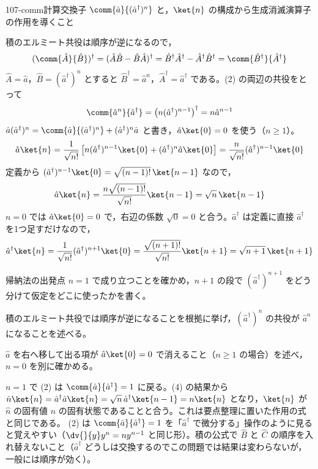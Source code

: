 \documentclass[uplatex,dvipdfmx,a4paper,11pt]{jsarticle}
\begin{document}
\begin{mondai}{107-comm}{計算}{交換子 $\comm{\hat{a}}{(\hat{a}^{\dagger})^{n}}$ と，$\ket{n}$ の構成から生成消滅演算子の作用を導くこと}
\begin{tadashii}
 積のエルミート共役は順序が逆になるので，
\[ (\comm{\hat{A}}{\hat{B}})^{\dagger}=(\hat{A}\hat{B}-\hat{B}\hat{A})^{\dagger}=\hat{B}^{\dagger}\hat{A}^{\dagger}-\hat{A}^{\dagger}\hat{B}^{\dagger}=\comm{\hat{B}^{\dagger}}{\hat{A}^{\dagger}} \]
$\hat{A}=\hat{a}$，$\hat{B}=(\hat{a}^{\dagger})^{n}$ とすると $\hat{B}^{\dagger}=\hat{a}^{n}$，$\hat{A}^{\dagger}=\hat{a}^{\dagger}$ である。(2) の両辺の共役をとって
\[ \comm{\hat{a}^{n}}{\hat{a}^{\dagger}}=\left(n(\hat{a}^{\dagger})^{n-1}\right)^{\dagger}=n\hat{a}^{n-1} \]
 $\hat{a}(\hat{a}^{\dagger})^{n}=\comm{\hat{a}}{(\hat{a}^{\dagger})^{n}}+(\hat{a}^{\dagger})^{n}\hat{a}$ と書き，$\hat{a}\ket{0}=0$ を使う（$n\ge 1$）。
\[ \hat{a}\ket{n}=\frac{1}{\sqrt{n!}}\left[n(\hat{a}^{\dagger})^{n-1}\ket{0}+(\hat{a}^{\dagger})^{n}\hat{a}\ket{0}\right]=\frac{n}{\sqrt{n!}}(\hat{a}^{\dagger})^{n-1}\ket{0} \]
定義から $(\hat{a}^{\dagger})^{n-1}\ket{0}=\sqrt{(n-1)!}\,\ket{n-1}$ なので，
\[ \hat{a}\ket{n}=\frac{n\sqrt{(n-1)!}}{\sqrt{n!}}\ket{n-1}=\sqrt{n}\,\ket{n-1} \]
$n=0$ では $\hat{a}\ket{0}=0$ で，右辺の係数 $\sqrt{0}=0$ と合う。$\hat{a}^{\dagger}$ は定義に直接 $\hat{a}^{\dagger}$ を1つ足すだけなので，
\[ \hat{a}^{\dagger}\ket{n}=\frac{1}{\sqrt{n!}}(\hat{a}^{\dagger})^{n+1}\ket{0}=\frac{\sqrt{(n+1)!}}{\sqrt{n!}}\ket{n+1}=\sqrt{n+1}\,\ket{n+1} \]
\begin{ronten}
  \item {} 帰納法の出発点 $n=1$ で成り立つことを確かめ，$n+1$ の段で $(\hat{a}^{\dagger})^{n+1}$ をどう分けて仮定をどこに使ったかを書く。
  \item {} 積のエルミート共役では順序が逆になることを根拠に挙げ，$(\hat{a}^{\dagger})^{n}$ の共役が $\hat{a}^{n}$ になることを述べる。
  \item {} $\hat{a}$ を右へ移して出る項が $\hat{a}\ket{0}=0$ で消えること（$n\ge1$ の場合）を述べ，$n=0$ を別に確かめる。
\end{ronten}
\kenzan $n=1$ で (2) は $\comm{\hat{a}}{\hat{a}^{\dagger}}=1$ に戻る。(4) の結果から $\hat{n}\ket{n}=\hat{a}^{\dagger}\hat{a}\ket{n}=\sqrt{n}\,\hat{a}^{\dagger}\ket{n-1}=n\ket{n}$ となり，$\ket{n}$ が $\hat{n}$ の固有値 $n$ の固有状態であることと合う。これは要点整理に置いた作用の式と同じである。
\tsumazuki (2) は $\comm{\hat{a}}{\hat{a}^{\dagger}}=1$ を「$\hat{a}^{\dagger}$ で微分する」操作のように見ると覚えやすい（$\dv{}{y}y^{n}=ny^{n-1}$ と同じ形）。積の公式で $\hat{B}$ と $\hat{C}$ の順序を入れ替えないこと（$\hat{a}^{\dagger}$ どうしは交換するのでこの問題では結果は変わらないが，一般には順序が効く）。
\end{tadashii}
\end{mondai}

\noteowari
\end{document}
